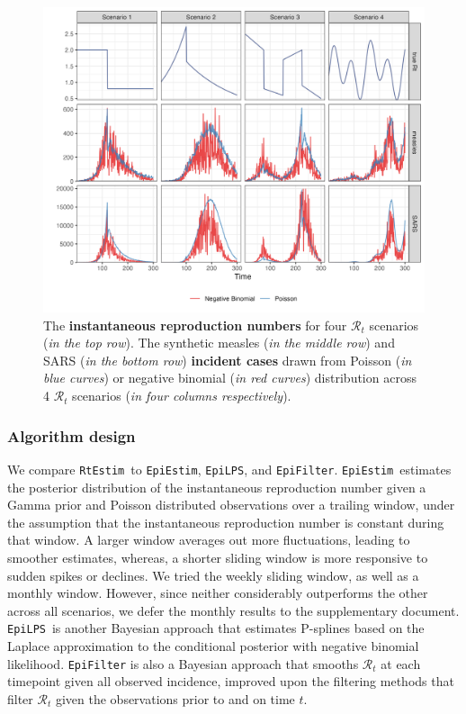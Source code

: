 \documentclass[10pt,letterpaper]{article}
\def\RtEstim{\texttt{RtEstim}}
\def\EpiEstim{\texttt{EpiEstim}}
\def\EpiLPS{\texttt{EpiLPS}}
\def\EpiFilter{\texttt{EpiFilter}}
\def\calR{\mathcal{R}}
\begin{document}
\begin{figure}[!ht]
  \centering
  \includegraphics[width=1.0\textwidth]{fig/fig_samples.png}
  \caption{The \textbf{instantaneous reproduction numbers} for four $\calR_t$ scenarios (\textit{in the top row}). 
  The synthetic measles (\textit{in the middle row}) and SARS (\textit{in the bottom row}) \textbf{incident cases} drawn 
  from Poisson (\textit{in blue curves}) or negative binomial (\textit{in red curves}) distribution 
  across 4 $\calR_t$ scenarios (\textit{in four columns respectively}).} 
  \label{fig:samples}
\end{figure}

\subsubsection{Algorithm design}

We compare \RtEstim\ to \EpiEstim, \EpiLPS, and \EpiFilter. \EpiEstim\ estimates
the posterior distribution of the instantaneous reproduction number given a Gamma
prior and Poisson distributed observations
over a trailing window, under the assumption that the instantaneous reproduction number is
constant during that window. A larger window averages out more fluctuations,
leading to smoother estimates, whereas, a shorter sliding window is more
responsive to sudden spikes or declines. We tried the weekly sliding
window, as well as a monthly window. However, since neither considerably
outperforms the other across all scenarios, we defer the monthly results to the
supplementary document. \EpiLPS\ is another Bayesian approach that estimates P-splines 
based on the Laplace approximation to the conditional posterior with negative
binomial likelihood. \texttt{EpiFilter} is also a Bayesian approach that smooths 
$\calR_t$ at each timepoint given all observed incidence, improved upon the filtering methods
that filter $\calR_t$ given the observations prior to and on time $t$.
\end{document}
